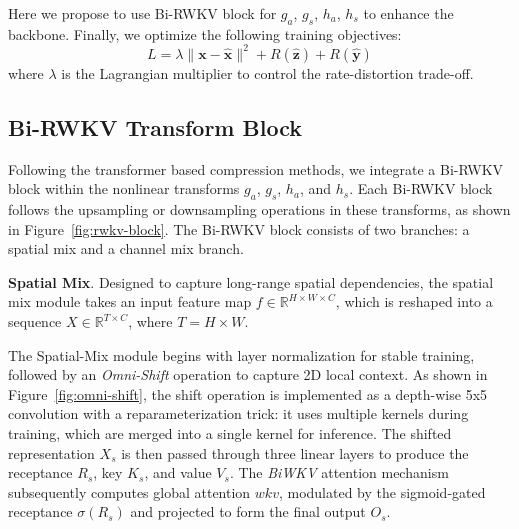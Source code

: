 Here we propose to use Bi-RWKV block for $g_a$, $g_s$, $h_a$, $h_s$ to enhance the backbone. Finally, we optimize the following training objectives:
\begin{equation}
 L = \lambda\|\boldsymbol{x}-\hat{\boldsymbol{x}}\|^2+R(\hat{\boldsymbol{z}})+R(\hat{\boldsymbol{y}})
\end{equation}
where $\lambda$ is the Lagrangian multiplier to control the rate-distortion trade-off.



\subsection{Bi-RWKV Transform Block}

Following the transformer based compression methods, we integrate a Bi-RWKV block within the nonlinear transforms \( g_a \), \( g_s \), \( h_a \), and \( h_s \). Each Bi-RWKV block follows the upsampling or downsampling operations in these transforms, as shown in Figure~\ref{fig:rwkv-block}. The Bi-RWKV block consists of two branches: a spatial mix and a channel mix branch.

\noindent\textbf{Spatial Mix}. Designed to capture long-range spatial dependencies, the spatial mix module takes an input feature map \( f \in \mathbb{R}^{H \times W \times C} \), which is reshaped into a sequence \( X \in \mathbb{R}^{T \times C} \), where \( T = H \times W \).


The Spatial-Mix module begins with layer normalization for stable training, followed by an \textit{Omni-Shift} operation to capture 2D local context. As shown in Figure~\ref{fig:omni-shift}, the shift operation is implemented as a depth-wise 5x5 convolution with a reparameterization trick: it uses multiple kernels during training, which are merged into a single kernel for inference. The shifted representation \( X_s \) is then passed through three linear layers to produce the receptance \( R_s \), key \( K_s \), and value \( V_s \). The \textit{BiWKV} attention mechanism subsequently computes global attention \( wkv \), modulated by the sigmoid-gated receptance \( \sigma(R_s) \) and projected to form the final output \( O_s \).

